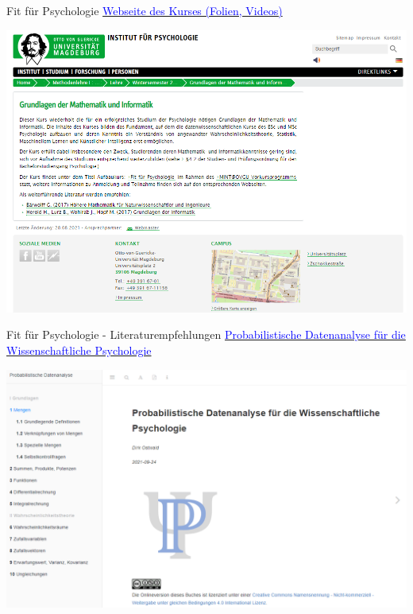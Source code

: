 \documentclass[
  8pt,
  ignorenonframetext,
  t]{beamer}
\begin{document}
\begin{frame}{Fit für Psychologie}
\protect\hypertarget{fit-fuxfcr-psychologie}{}
\href{https://www.ipsy.ovgu.de/Institut/Abteilungen+des+Institutes/Methodenlehre+I+_+Experimentelle+und+Neurowissenschaftliche+Psychologie/Lehre/Wintersemester+2022/Grundlagen+der+Mathematik+und+Informatik.html}{\textcolor{blue}{Webseite des Kurses (Folien, Videos)}}

\vspace{5mm}

\begin{center}\includegraphics[width=0.75\linewidth]{../Abbildungen/glmi_0_kursseite} \end{center}
\color{red}{TODO: git einfügen mit Anleitung zum Beitragen, Uni-Website aktualisieren}
\end{frame}

\begin{frame}{Fit für Psychologie - Literaturempfehlungen}
\protect\hypertarget{fit-fuxfcr-psychologie---literaturempfehlungen}{}
\href{https://wasd.urz.uni-magdeburg.de/dostwald/}{\textcolor{blue}{Probabilistische Datenanalyse für die Wissenschaftliche Psychologie}}

\vspace{7mm}

\begin{center}\includegraphics[width=0.8\linewidth]{../Abbildungen/glmi_0_pdwp} \end{center}
\end{frame}
\end{document}
